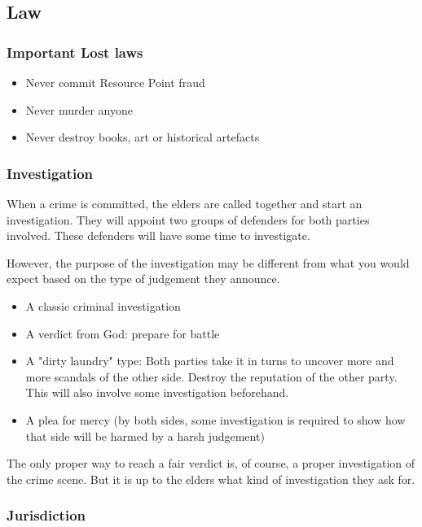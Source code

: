 \subsection{Law}
\label{sec:Lost law}

\subsubsection{Important Lost laws}

\begin{itemize}
\item{Never commit Resource Point fraud}
\item{Never murder anyone}
\item{Never destroy books, art or historical artefacts}
\end{itemize}

\subsubsection{Investigation}

When a crime is committed, the elders are called together and start an investigation. They will appoint two groups of defenders for both parties involved. These defenders will have some time to investigate.

However, the purpose of the investigation may be different from what you would expect based on the type of judgement they announce.

\begin{itemize}
    \item A classic criminal investigation
    \item A verdict from God: prepare for battle
    \item A "dirty laundry" type: Both parties take it in turns to uncover more and more scandals of the other side. Destroy the reputation of the other party. This will also involve some investigation beforehand.
    \item A plea for mercy (by both sides, some investigation is required to show how that side will be harmed by a harsh judgement)
\end{itemize}

The only proper way to reach a fair verdict is, of course, a proper investigation of the crime scene. But it is up to the elders what kind of investigation they ask for.

\subsubsection{Jurisdiction}

